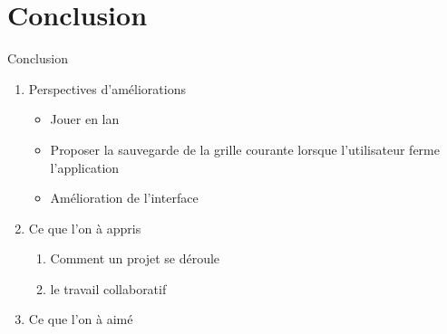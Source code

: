 \documentclass[12pt]{beamer}
\begin{document}
\section{Conclusion}
    \begin{frame}{Conclusion}
        
        \begin{enumerate}
            \item Perspectives d'améliorations
            \begin{itemize}
                \item Jouer en lan
                \item Proposer la sauvegarde de la grille courante lorsque l'utilisateur ferme l'application
                \item Amélioration de l'interface 
            \end{itemize}
            
            \item Ce que l'on à appris
            \begin{enumerate}
                \item Comment un projet se déroule
                \item le travail collaboratif
            \end{enumerate}
            
            \item Ce que l'on à aimé
            
         
        \end{enumerate}
    \end{frame}
    
\appendix[Questions ?]
\end{document}
